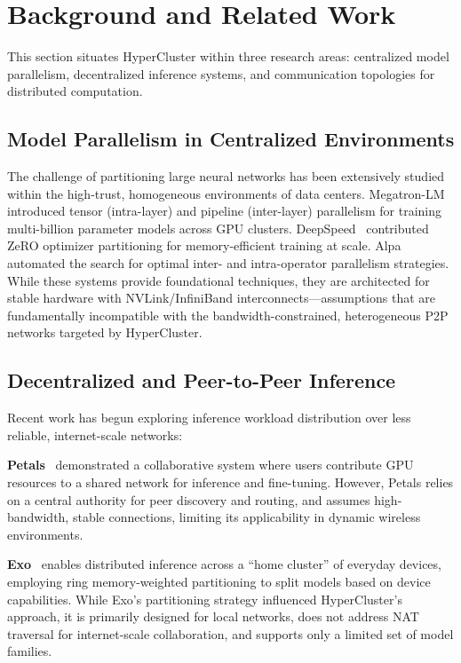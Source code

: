 \documentclass[runningheads]{llncs}
\begin{document}
\section{Background and Related Work}
\label{sec:related}

This section situates HyperCluster within three research areas: centralized model parallelism, decentralized inference systems, and communication topologies for distributed computation.

\subsection{Model Parallelism in Centralized Environments}

The challenge of partitioning large neural networks has been extensively studied within the high-trust, homogeneous environments of data centers. Megatron-LM~\cite{shoeybi2019megatron} introduced tensor (intra-layer) and pipeline (inter-layer) parallelism for training multi-billion parameter models across GPU clusters. DeepSpeed~\cite{rasley2020deepspeed} contributed ZeRO optimizer partitioning for memory-efficient training at scale. Alpa~\cite{zheng2022alpa} automated the search for optimal inter- and intra-operator parallelism strategies. While these systems provide foundational techniques, they are architected for stable hardware with NVLink/InfiniBand interconnects---assumptions that are fundamentally incompatible with the bandwidth-constrained, heterogeneous P2P networks targeted by HyperCluster.

\subsection{Decentralized and Peer-to-Peer Inference}

Recent work has begun exploring inference workload distribution over less reliable, internet-scale networks:

\smallskip
\noindent\textbf{Petals}~\cite{borzunov2023petals} demonstrated a collaborative system where users contribute GPU resources to a shared network for inference and fine-tuning. However, Petals relies on a central authority for peer discovery and routing, and assumes high-bandwidth, stable connections, limiting its applicability in dynamic wireless environments.

\smallskip
\noindent\textbf{Exo}~\cite{exo} enables distributed inference across a ``home cluster'' of everyday devices, employing ring memory-weighted partitioning to split models based on device capabilities. While Exo's partitioning strategy influenced HyperCluster's approach, it is primarily designed for local networks, does not address NAT traversal for internet-scale collaboration, and supports only a limited set of model families.
\end{document}
